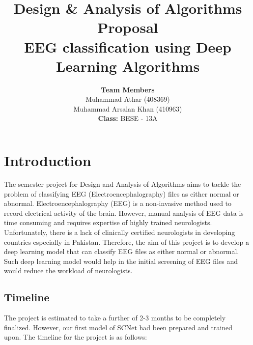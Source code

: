 \documentclass[11pt]{article}
\title{\textbf{Design \& Analysis of Algorithms Proposal \\ \vspace{5mm} EEG classification using Deep Learning Algorithms}}
\author{\textbf{Team Members} \vspace{1mm} \\ Muhammad Athar (408369) \\ Muhammad Arsalan Khan (410963) \vspace{5mm} \\ \textbf{Class: }BESE - 13A}
\begin{document}
\maketitle

\justifying
\section{Introduction}
The semester project for Design and Analysis of Algorithms aims to tackle the problem of classifying EEG (Electroencephalography) files as either normal or abnormal.
Electroencephalography (EEG) is a non-invasive method used to record electrical activity of the brain. However, manual analysis of EEG data is time consuming and requires expertise of highly trained neurologists. Unfortunately, there is a lack of clinically certified neurologists in developing countries especially in Pakistan. Therefore, the aim of this project is to develop a deep learning model that can classify EEG files as either normal or abnormal. Such deep learning model would help in the initial screening of EEG files and would reduce the workload of neurologists.

\subsection{Timeline}
The project is estimated to take a further of 2-3 months to be completely finalized. However, our first model of SCNet had been prepared and trained upon.
The timeline for the project is as follows:

\begin{center}
\end{center}
\end{document}
